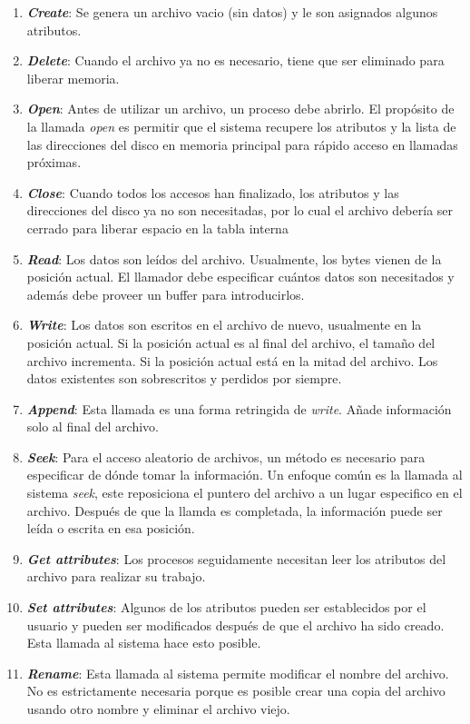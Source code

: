 \documentclass[12pt, a4paper]{article} %
\begin{document}
\begin{enumerate}
	\item \textbf{\textit{Create}}: Se genera un archivo vacio (sin datos) y le son asignados algunos atributos.
	\item \textbf{\textit{Delete}}: Cuando el archivo ya no es necesario, tiene que ser eliminado para liberar memoria.
	\item \textbf{\textit{Open}}: Antes de utilizar un archivo, un proceso debe abrirlo. El propósito de la llamada \textit{open} es permitir que el sistema recupere los atributos y la lista de las direcciones del disco en memoria principal para rápido acceso en llamadas próximas.
	\item \textbf{\textit{Close}}: Cuando todos los accesos han finalizado, los atributos y las direcciones del disco ya no son necesitadas, por lo cual el archivo debería ser cerrado para liberar espacio en la tabla interna
	\item \textbf{\textit{Read}}: Los datos son leídos del archivo. Usualmente, los bytes vienen de la posición actual. El llamador debe especificar cuántos datos son necesitados y además debe proveer un buffer para introducirlos.
	\item \textbf{\textit{Write}}: Los datos son escritos en el archivo de nuevo, usualmente en la posición actual. Si la posición actual es al final del archivo, el tamaño del archivo incrementa. Si la posición actual está en la mitad del archivo. Los datos existentes son sobrescritos y perdidos por siempre.
	\item \textbf{\textit{Append}}: Esta llamada es una forma retringida de \textit{write}. Añade información solo al final del archivo.
	\item \textbf{\textit{Seek}}: Para el acceso aleatorio de archivos, un método es necesario para especificar de dónde tomar la información. Un enfoque común es la llamada al sistema \textit{seek}, este reposiciona el puntero del archivo a un lugar especifico en el archivo. Después de que la llamda es completada, la información puede ser leída o escrita en esa posición.
	\item \textbf{\textit{Get attributes}}: Los procesos seguidamente necesitan leer los atributos del archivo para realizar su trabajo.
	\item \textbf{\textit{Set attributes}}: Algunos de los atributos pueden ser establecidos por el usuario y pueden ser modificados después de que el archivo ha sido creado. Esta llamada al sistema hace esto posible.
	\item \textbf{\textit{Rename}}: Esta llamada al sistema permite modificar el nombre del archivo. No es estrictamente necesaria porque es posible crear una copia del archivo usando otro nombre y eliminar el archivo viejo.
\end{enumerate}
\end{document}
